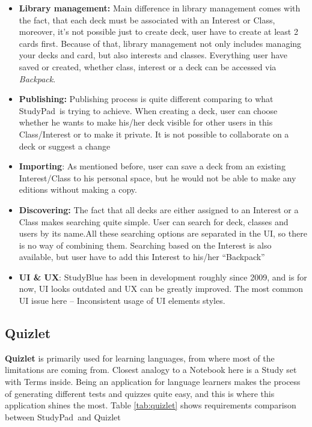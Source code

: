 \documentclass[thesis=B,english]{FITthesis}[2012/10/20]
\newcommand{\appname}{StudyPad}
\begin{document}
\begin{itemize}
	\item \textbf{Library management:} Main difference in library management comes with the fact, that each deck must be associated with an Interest or Class, moreover, it's not possible just to create deck, user have to create at least 2 cards first. Because of that, library management not only includes managing your decks and card, but also interests and classes. Everything user have saved or created, whether class, interest or a deck can be accessed via \textit{Backpack}.
	\item \textbf{Publishing:} Publishing process is quite different comparing to what \appname\ is trying to achieve. When creating a deck, user can choose whether he wants to make his/her deck visible for other users in this Class/Interest or to make it private. It is not possible to collaborate on a deck or suggest a change
	
	\item \textbf{Importing}: As mentioned before, user can save a deck from an existing Interest/Class to his personal space, but he would not be able to make any editions without making a copy.
	\item \textbf{Discovering:} The fact that all decks are either assigned to an Interest or a Class makes searching quite simple. User can search for deck, classes and users by its name.All these searching options are separated in the UI, so there is no way of combining them. Searching based on the Interest is also available, but user have to add this Interest to his/her \enquote{Backpack}
	\item \textbf{UI \&  UX}: StudyBlue has been in development roughly since 2009, and is for now, UI looks outdated and UX can be greatly improved. The most common UI issue here -- Inconsistent usage of UI elements styles.
\end{itemize}

 \subsection{Quizlet}
\textbf{Quizlet} is primarily used for learning languages, from where most of the limitations are coming from. Closest analogy to a Notebook here is a Study set with Terms inside. Being an application for language learners makes the process of generating different tests and quizzes quite easy, and this is where this application shines the most. Table \ref{tab:quizlet} shows requirements comparison between \appname\ and Quizlet
\end{document}
